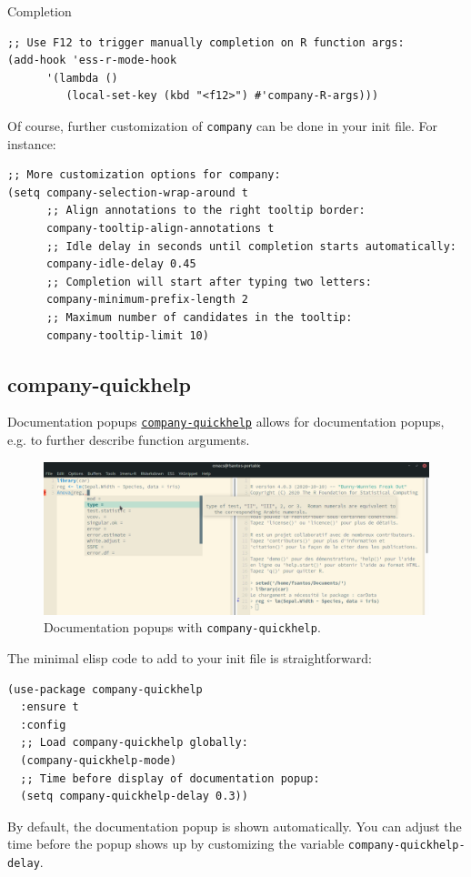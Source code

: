 \documentclass[presentation]{beamer}
\begin{document}
\begin{frame}[fragile,allowframebreaks,label=]{Completion}
\begin{verbatim}
;; Use F12 to trigger manually completion on R function args:
(add-hook 'ess-r-mode-hook
	  '(lambda ()
	     (local-set-key (kbd "<f12>") #'company-R-args)))
\end{verbatim}

\pagebreak

Of course, further customization of \texttt{company} can be done in your init file. For instance:

\begin{verbatim}
;; More customization options for company:
(setq company-selection-wrap-around t
      ;; Align annotations to the right tooltip border:
      company-tooltip-align-annotations t
      ;; Idle delay in seconds until completion starts automatically:
      company-idle-delay 0.45
      ;; Completion will start after typing two letters:
      company-minimum-prefix-length 2
      ;; Maximum number of candidates in the tooltip:
      company-tooltip-limit 10)
\end{verbatim}
\end{frame}

\subsection{company-quickhelp}
\label{sec:org3d8c483}
\begin{frame}[fragile,allowframebreaks,label=]{Documentation popups}
 \href{https://github.com/company-mode/company-quickhelp}{\texttt{company-quickhelp}} allows for documentation popups, e.g. to further describe function arguments.

\begin{figure}[htbp]
\centering
\includegraphics[width=\textwidth]{./images/company-quickhelp.png}
\caption{Documentation popups with \texttt{company-quickhelp}.}
\end{figure}

The minimal elisp code to add to your init file is straightforward:

\begin{verbatim}
(use-package company-quickhelp
  :ensure t
  :config
  ;; Load company-quickhelp globally:
  (company-quickhelp-mode)
  ;; Time before display of documentation popup:
  (setq company-quickhelp-delay 0.3))
\end{verbatim}

By default, the documentation popup is shown automatically. You can adjust the time before the popup shows up by customizing the variable \texttt{company-quickhelp-delay}.
\end{frame}
\end{document}
